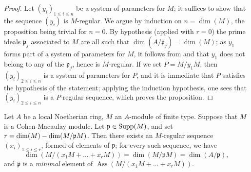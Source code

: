 \begin{proof}
Let $(y_i)_{1\leq i\leq n}$ be a system of parameters for $M$; it suffices to show that the sequence $(y_i)$ is $M$-regular.
We argue by induction on $n=\dim(M)$, the proposition being trivial for $n=0$.
By hypothesis (applied with $r=0$) the prime ideals $\mathfrak{p}_j$ associated to $M$ are all such that $\dim(A/\mathfrak{p}_j)=\dim(M)$; as $y_1$ forms part of a system of parameters
for $M$, it follows from  and  that $y_1$ does not belong to any of the $\mathfrak{p}_j$, hence is $M$-regular.
If we set $P=M/y_1M$, then $(y_i)_{2\leq i\leq n}$ is a system of parameters for $P$, and it is immediate that $P$ satisfies the hypothesis of the statement; applying the induction hypothesis, one sees that $(y_i)_{2\leq i\leq n}$ is a $P$-regular sequence, which proves the proposition.
\end{proof}

\begin{proposition}[16.5.9]
\label{0.16.5.9}
Let $A$ be a local Noetherian ring, $M$ an $A$-module of finite type.
Suppose that $M$ is a Cohen-Macaulay module.
Let $\mathfrak{p}\in\operatorname{Supp}(M)$, and set $r=\dim(M)-\dim(M/\mathfrak{p}M)$.
Then there exists an $M$-regular sequence $(x_i)_{1\leq i\leq r}$, formed of elements of $\mathfrak{p}$; for every such sequence, we have
\[
  \dim(M/(x_1M+\ldots+x_r M))=\dim(M/\mathfrak{p}M)=\dim(A/\mathfrak{p}),
\]
and $\mathfrak{p}$ is a \emph{minimal} element of $\operatorname{Ass}(M/(x_1M+\ldots+x_r M))$.
\end{proposition}

